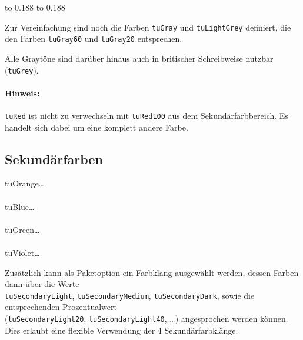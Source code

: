 {\sffamily\footnotesize%
\colorbox{tuRed}{\hbox to 0.188}%
\colorbox{tuBlack}{\hbox to 0.188}%
\\%
}


Zur Vereinfachung sind noch die Farben \lstinline{tuGray} und
\lstinline{tuLightGrey} definiert, die den Farben \lstinline{tuGray60} und
\lstinline{tuGray20} entsprechen.

Alle Graytöne sind darüber hinaus auch in britischer Schreibweise nutzbar
(\lstinline{tuGrey}).

\paragraph{Hinweis:}
\lstinline{tuRed} ist nicht zu verwechseln mit \lstinline{tuRed100} aus dem
Sekundärfarbbereich. Es handelt sich dabei um eine komplett andere Farbe.

\pagebreak
\subsection{Sekundärfarben}
  tuOrange\ldots\\
  \\[-1ex]
  tuBlue\ldots\\
  \\[-1ex]
  tuGreen\ldots\\
  \\[-1ex]
  tuViolet\ldots\\


Zusätzlich kann als Paketoption ein Farbklang ausgewählt werden, dessen Farben
dann über die Werte  \\\lstinline{tuSecondaryLight},
\lstinline{tuSecondaryMedium}, \lstinline{tuSecondaryDark}, sowie die
entsprechenden Prozentualwert \\(\lstinline{tuSecondaryLight20},
\lstinline{tuSecondaryLight40}, \ldots) angesprochen werden können.
Dies erlaubt eine flexible Verwendung der 4 Sekundärfarbklänge.

